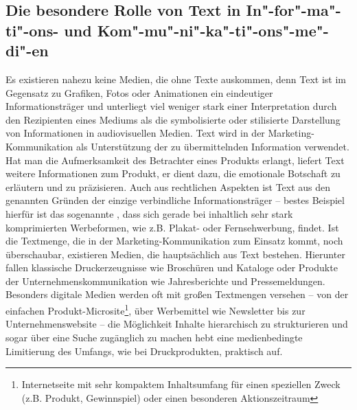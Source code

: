 \subsection{Die besondere Rolle von Text in In"-for"-ma"-ti"-ons- und Kom"-mu"-ni"-ka"-ti"-ons"-me"-di"-en}\label{l:besondererolle}

Es existieren nahezu keine Medien, die ohne Texte auskommen, denn Text ist im Gegensatz zu Grafiken, Fotos oder Animationen ein eindeutiger Informationsträger und unterliegt viel weniger stark einer Interpretation durch den Rezipienten eines Mediums als die symbolisierte oder stilisierte Darstellung von Informationen in audiovisuellen Medien. Text wird in der Marketing-Kommunikation als Unterstützung der zu übermittelnden Information verwendet. Hat man die Aufmerksamkeit des Betrachter eines Produkts erlangt, liefert Text weitere Informationen zum Produkt, er dient dazu, die emotionale Botschaft zu erläutern und zu präzisieren. Auch aus rechtlichen Aspekten ist Text aus den genannten Gründen der einzige verbindliche Informationsträger -- bestes Beispiel hierfür ist das sogenannte , dass sich gerade bei inhaltlich sehr stark komprimierten Werbeformen, wie z.B. Plakat- oder Fernsehwerbung, findet. Ist die Textmenge, die in der Marketing-Kommunikation zum Einsatz kommt, noch überschaubar, existieren Medien, die hauptsächlich aus Text bestehen. Hierunter fallen klassische Druckerzeugnisse wie Broschüren und Kataloge oder Produkte der Unternehmenskommunikation wie Jahresberichte und Pressemeldungen. Besonders digitale Medien werden oft mit großen Textmengen versehen -- von der einfachen Produkt-Microsite\footnote{Internetseite mit sehr kompaktem Inhaltsumfang für einen speziellen Zweck (z.B. Produkt, Gewinnspiel) oder einen besonderen Aktionszeitraum}, über Werbemittel wie Newsletter bis zur Unternehmenswebsite -- die Möglichkeit Inhalte hierarchisch zu strukturieren und sogar über eine Suche zugänglich zu machen hebt eine medienbedingte Limitierung des Umfangs, wie bei Druckprodukten, praktisch auf.

